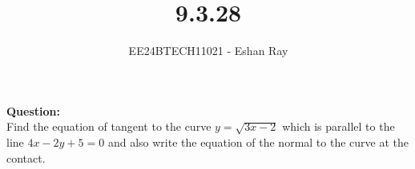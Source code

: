\documentclass[journal]{IEEEtran}
\begin{document}

\vspace{3cm}

\title{9.3.28}
\author{EE24BTECH11021 - Eshan Ray}

{\let\newpage\relax\maketitle}

\renewcommand{\thefigure}{\theenumi}
\renewcommand{\thetable}{\theenumi}
\setlength{\intextsep}{10pt} %




\textbf{Question: }\\
Find the equation of tangent to the curve $y = \sqrt{3x - 2}$ which is parallel to the line $4x - 2y + 5 = 0$ and also write the equation of the normal to the curve at the contact.\\
\end{document}
